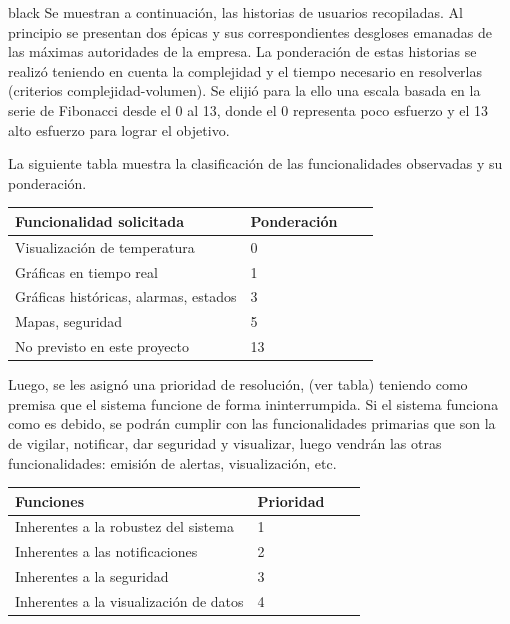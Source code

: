 \documentclass[11pt]{charter}
\begin{document}
\begin{consigna}{black}
Se muestran a continuación, las historias de usuarios recopiladas. Al principio se presentan dos épicas y sus correspondientes desgloses emanadas de las máximas autoridades de la empresa.
La ponderación de estas historias se realizó teniendo en cuenta la complejidad y el tiempo necesario en resolverlas (criterios complejidad-volumen). Se elijió para la ello una escala basada en la serie de Fibonacci desde el 0 al 13, donde el 0 representa poco esfuerzo y el 13 alto esfuerzo para lograr el objetivo. 

La siguiente tabla muestra la clasificación de las funcionalidades observadas y su ponderación.


\begin{table}[ht]
\begin{tabularx}{\linewidth}{@{}|l|X|X|l|@{}}
\hline
\rowcolor[HTML]{C0C0C0} 
Funcionalidad solicitada           & Ponderación 	\\ \hline

Visualización de temperatura & 0\\ \hline
Gráficas en tiempo real & 1\\ \hline
Gráficas históricas, alarmas, estados & 3\\ \hline
Mapas, seguridad & 5\\ \hline
No previsto en este proyecto & 13\\ \hline

\end{tabularx}
\end{table}
Luego, se les asignó una prioridad de resolución, (ver tabla) teniendo como premisa que el sistema funcione de forma ininterrumpida. Si el sistema funciona como es debido, se podrán cumplir con las funcionalidades primarias que son la de vigilar, notificar, dar seguridad y visualizar, luego vendrán las otras funcionalidades: emisión de alertas, visualización, etc.

\begin{table}[ht]
\begin{tabularx}{\linewidth}{@{}|l|X|X|l|@{}}
\hline
\rowcolor[HTML]{C0C0C0}
Funciones           & Prioridad 	\\ \hline
Inherentes a la robustez del sistema & 1 \\ \hline
Inherentes a las notificaciones & 2 \\ \hline
Inherentes a la seguridad & 3 \\ \hline
Inherentes a la visualización de datos &4 \\ \hline


\end{tabularx}
\end{table}
\end{consigna}
\end{document}
